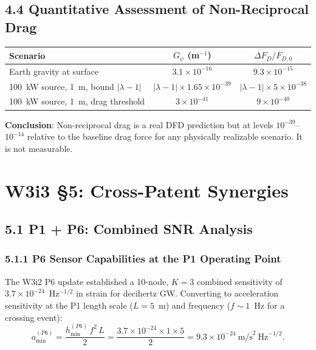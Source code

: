 \documentclass[11pt,twocolumn]{article}
\newcommand{\lam}{\lambda}
\begin{document}
\subsection*{4.4 Quantitative Assessment of Non-Reciprocal Drag}

\begin{center}
\begin{tabular}{@{}lcc@{}}
\toprule
\textbf{Scenario} & $G_\psi$ (m$^{-1}$) & $\Delta F_D / F_{D,0}$ \\
\midrule
Earth gravity at surface & $3.1\times10^{-16}$ & $9.3\times10^{-15}$ \\
100~kW source, 1~m, bound $|\lam-1|$ & $|\lam-1|\times1.65\times10^{-39}$ & $|\lam-1|\times5\times10^{-38}$ \\
100~kW source, 1~m, drag threshold & $3\times10^{-41}$ & $9\times10^{-40}$ \\
\bottomrule
\end{tabular}
\end{center}

\textbf{Conclusion}: Non-reciprocal drag is a real DFD prediction but at
levels $10^{-39}$--$10^{-14}$ relative to the baseline drag force for any
physically realizable scenario. It is not measurable.

\section*{W3i3 \S5: Cross-Patent Synergies}
\label{sec:cross_patent}

\subsection*{5.1 P1 + P6: Combined SNR Analysis}

\subsubsection*{5.1.1 P6 Sensor Capabilities at the P1 Operating Point}

The W3i2 P6 update established a 10-node, $K=3$ combined sensitivity of
$3.7\times10^{-24}$~Hz$^{-1/2}$ in strain for decihertz GW. Converting
to acceleration sensitivity at the P1 length scale ($L = 5$~m) and
frequency ($f \sim 1$~Hz for a crossing event):
\begin{equation}
a_{\min}^{(P6)} = \frac{h_{\min}^{(P6)}\,f^2\,L}{2}
= \frac{3.7\times10^{-24}\times1\times5}{2}
= 9.3\times10^{-24}~\text{m/s}^2~\text{Hz}^{-1/2}.
\label{eq:P6_accel_sensitivity}
\end{equation}
\end{document}
